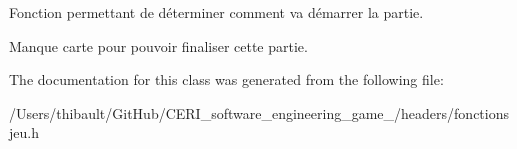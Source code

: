 Fonction permettant de déterminer comment va démarrer la partie. 

Manque carte pour pouvoir finaliser cette partie. 

The documentation for this class was generated from the following file\+:\begin{DoxyCompactItemize}
\item 
/\+Users/thibault/\+Git\+Hub/\+C\+E\+R\+I\+\_\+software\+\_\+engineering\+\_\+game\+\_/headers/fonctionsjeu.\+h\end{DoxyCompactItemize}
